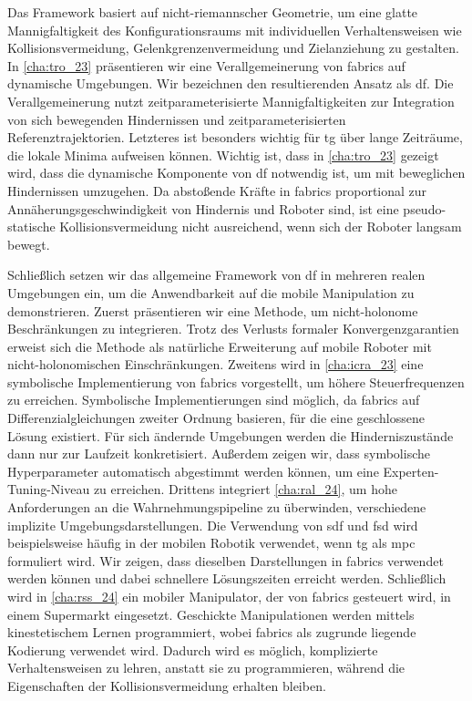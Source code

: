 Das Framework basiert auf nicht-riemannscher Geometrie, um eine glatte
Mannigfaltigkeit des Konfigurationsraums mit individuellen Verhaltensweisen wie
Kollisionsvermeidung, Gelenkgrenzenvermeidung und Zielanziehung zu gestalten. In
\cref{cha:tro_23} präsentieren wir eine Verallgemeinerung von \ac{fabrics} auf
dynamische Umgebungen. Wir bezeichnen den resultierenden Ansatz als \ac{df}. Die
Verallgemeinerung nutzt zeitparameterisierte Mannigfaltigkeiten zur Integration
von sich bewegenden Hindernissen und zeitparameterisierten Referenztrajektorien.
Letzteres ist besonders wichtig für \ac{tg} über lange Zeiträume, die lokale Minima
aufweisen können. Wichtig ist, dass in \cref{cha:tro_23} gezeigt wird, dass die
dynamische Komponente von \ac{df} notwendig ist, um mit beweglichen Hindernissen
umzugehen. Da abstoßende Kräfte in \ac{fabrics} proportional zur
Annäherungsgeschwindigkeit von Hindernis und Roboter sind, ist eine
pseudo-statische Kollisionsvermeidung nicht ausreichend, wenn sich der Roboter
langsam bewegt.

Schließlich setzen wir das allgemeine Framework von \ac{df} in mehreren realen
Umgebungen ein, um die Anwendbarkeit auf die mobile Manipulation zu
demonstrieren. Zuerst präsentieren wir eine Methode, um nicht-holonome
Beschränkungen zu integrieren. Trotz des Verlusts formaler
Konvergenzgarantien erweist sich die Methode als natürliche Erweiterung auf
mobile Roboter mit nicht-holonomischen Einschränkungen. Zweitens wird in
\cref{cha:icra_23} eine symbolische Implementierung von \ac{fabrics}
vorgestellt, um höhere Steuerfrequenzen zu erreichen. Symbolische
Implementierungen sind möglich, da \ac{fabrics} auf
Differenzialgleichungen zweiter Ordnung basieren, für die eine geschlossene
Lösung existiert. Für sich ändernde Umgebungen werden die Hinderniszustände dann
nur zur Laufzeit konkretisiert. Außerdem zeigen wir, dass symbolische
Hyperparameter automatisch abgestimmt werden können, um eine
Experten-Tuning-Niveau zu erreichen. Drittens integriert \cref{cha:ral_24}, um
hohe Anforderungen an die Wahrnehmungspipeline zu überwinden, verschiedene
implizite Umgebungsdarstellungen. Die Verwendung von \ac{sdf} und
\ac{fsd} wird beispielsweise häufig in der mobilen Robotik verwendet, wenn
\ac{tg} als \ac{mpc} formuliert wird. Wir zeigen, dass dieselben Darstellungen
in \ac{fabrics} verwendet werden können und dabei schnellere Lösungszeiten
erreicht werden. Schließlich wird in \cref{cha:rss_24} ein mobiler Manipulator,
der von \ac{fabrics} gesteuert wird, in einem Supermarkt eingesetzt. Geschickte
Manipulationen werden mittels kinestetischem Lernen
programmiert, wobei
\ac{fabrics} als zugrunde liegende Kodierung verwendet wird. Dadurch wird es
möglich, komplizierte Verhaltensweisen zu lehren, anstatt sie zu programmieren,
während die Eigenschaften der Kollisionsvermeidung erhalten bleiben.


